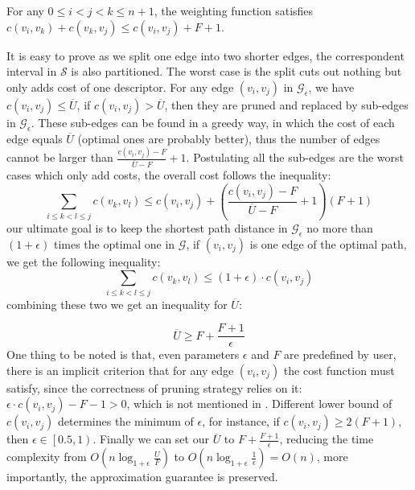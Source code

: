 \documentclass[runningheads,a4paper]{llncs}
\begin{document}
\begin{proposition}
	For any $0\leqslant i < j < k \leqslant n+1$, the weighting function satisfies $c\left(v_{i},v_{k}\right)+c\left(v_{k},v_{j}\right) \leqslant c\left(v_{i},v_{j}\right)+F+1$.
\end{proposition}

It is easy to prove as we split one edge into two shorter edges, the correspondent interval in $\mathcal{S}$ is also partitioned. The worst case is the split cuts out nothing but only adds cost of one descriptor. For any edge $\left(v_{i},v_{j}\right)$ in $\mathcal{G}_{\epsilon}$, we have $ c\left(v_{i},v_{j}\right) \leqslant \overline{U}$, if $c\left(v_{i},v_{j}\right)>\overline{U}$, then they are pruned and replaced by sub-edges in $\mathcal{G}_{\epsilon}$. These sub-edges can be found in a greedy way, in which the cost of each edge equals $\overline{U}$ (optimal ones are probably better), thus the number of edges cannot be larger than $\frac{c\left ( v_{i},v_{j} \right )-F}{\overline{U}-F}+1$. Postulating all the sub-edges are the worst cases which only add costs, the overall cost follows the inequality:
\begin{equation}
\sum_{i\leqslant k < l \leqslant j}c\left(v_{k},v_{l} \right ) \leqslant c\left(v_{i},v_{j} \right )+\left(\frac{c\left(v_{i},v_{j} \right )-F}{\overline{U}-F}+1\right)\left(F+1 \right )
\end{equation}
\noindent our ultimate goal is to keep the shortest path distance in $\mathcal{G}_{\epsilon}$ no more than $\left( 1+\epsilon\right)$ times the optimal one in $\mathcal{G}$, if $\left(v_{i},v_{j}\right)$ is one edge of the optimal path, we get the following inequality:
\begin{equation}
\sum_{i\leqslant k < l \leqslant j}c\left(v_{k},v_{l} \right ) \leqslant \left(1+\epsilon \right )\cdot c\left(v_{i},v_{j} \right )
\end{equation}
\noindent combining these two we get an inequality for $\overline{U}$:

\begin{equation}
\overline{U} \geqslant F+\frac{F+1}{\epsilon}
\end{equation}
\noindent One thing to be noted is that, even parameters $\epsilon$ and $F$ are predefined by user, there is an implicit criterion that for any edge $ \left(v_{i},v_{j} \right )$ the cost function must satisfy, since the correctness of pruning strategy relies on it: $\epsilon\cdot c\left(v_{i},v_{j} \right )-F-1>0$, which is not mentioned in \cite{ottaviano2014partitioned}. Different lower bound of $c\left(v_{i},v_{j} \right )$ determines the minimum of $\epsilon$, for instance, if $c\left(v_{i},v_{j} \right )\geqslant 2\left(F+1\right)$, then $\epsilon\in \left[ 0.5,1\right)$. Finally we can set our $\overline{U}$ to $F+\frac{F+1}{\epsilon} $, reducing the time complexity from $O\left( n\log_{1+\epsilon}\frac{U}{F}\right)$ to $O\left(n\log_{1+\epsilon}\frac{1}{\epsilon}\right)=O\left(n\right)$, more importantly, the approximation guarantee is preserved.
\end{document}
